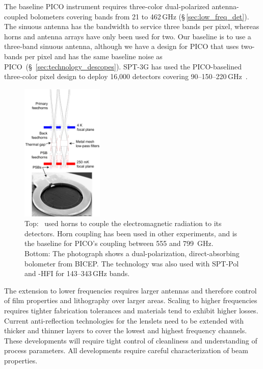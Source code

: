 

The baseline PICO instrument requires three-color dual-polarized antenna-coupled bolometers covering bands from 21 to 462\,GHz
(\S\,\ref{sec:low_freq_det}).  The sinuous antenna has the bandwidth to service three bands per pixel, whereas horns and antenna arrays have only been used for two. Our baseline is to use a three-band sinuous antenna, although we have a design for PICO that uses two-bands per pixel and has the same baseline noise as PICO~(\S~\ref{sec:technology_descopes}). SPT-3G has used the PICO-baselined three-color pixel design to deploy 16,000 detectors covering 90--150--220\,GHz~\citep{Dutcher2018}.

%
%
\begin{figure}  %
\centering
\vspace{-5pt} %
\includegraphics[width=0.35\textwidth]{figures/DirectAbsorbing.png}  %
\vspace{-0.25in}
\caption{\captiontext Top: \planck\ used horns to couple the electromagnetic radiation to its detectors. Horn coupling has been used in other experiments, and is the baseline for PICO's coupling between 555 and 799~GHz. Bottom: The photograph shows a dual-polarization, direct-absorbing bolometer from BICEP. The technology was also used with SPT-Pol and \planck-HFI for 143--343\,GHz bands.
\label{fig:DirectAbsorbing} }
\end{figure}
%
%
The extension to lower frequencies requires larger antennas and therefore control of film properties and lithography over larger areas. Scaling to higher frequencies requires tighter fabrication tolerances and materials tend to exhibit higher losses. Current anti-reflection technologies for the lenslets need to be extended with thicker and thinner layers to cover the lowest and highest frequency channels. These developments will require tight control of cleanliness and understanding of process parameters. All developments require careful characterization of beam properties.

